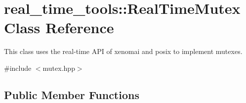 \hypertarget{classreal__time__tools_1_1RealTimeMutex}{}\section{real\+\_\+time\+\_\+tools\+:\+:Real\+Time\+Mutex Class Reference}
\label{classreal__time__tools_1_1RealTimeMutex}


This class uses the real-\/time A\+PI of xenomai and posix to implement mutexes.  




{\ttfamily \#include $<$mutex.\+hpp$>$}

\subsection*{Public Member Functions}
